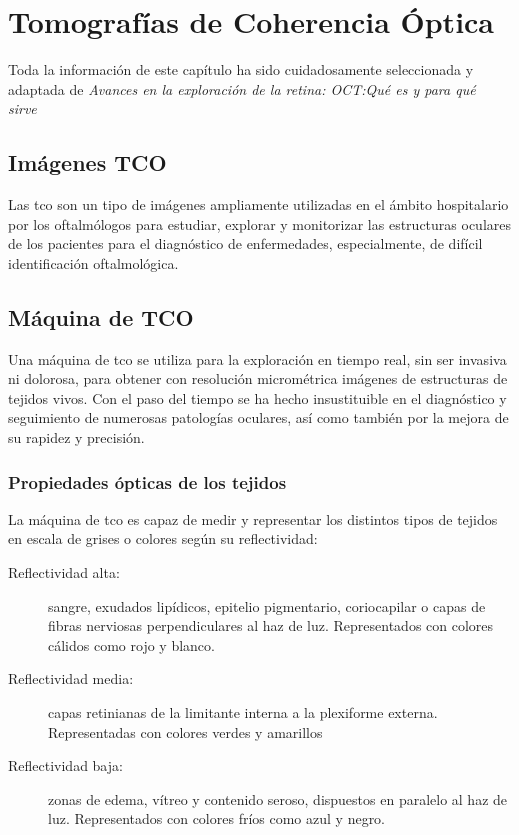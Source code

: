 \chapter{Tomografías de Coherencia Óptica}
Toda la información de este capítulo ha sido cuidadosamente
seleccionada y adaptada de \emph{Avances en la exploración de la
  retina: OCT:\@ Qué es y para qué sirve}~\citep*{oct-bib}

\section{Imágenes TCO}
Las \gls{tco} son un tipo de imágenes ampliamente utilizadas en el
ámbito hospitalario por los oftalmólogos para estudiar, explorar y
monitorizar las estructuras oculares de los pacientes para el
diagnóstico de enfermedades, especialmente, de difícil identificación
oftalmológica.

\section{Máquina de TCO}
Una máquina de \gls{tco} se utiliza para la exploración en tiempo
real, sin ser invasiva ni dolorosa, para obtener con resolución
micrométrica imágenes de estructuras de tejidos vivos. Con el paso del
tiempo se ha hecho insustituible en el diagnóstico y seguimiento de
numerosas patologías oculares, así como también por la mejora de su
rapidez y precisión.

\subsection{Propiedades ópticas de los tejidos}
La máquina de \gls{tco} es capaz de medir y representar los distintos
tipos de tejidos en escala de grises o colores según su reflectividad:
\begin{description}
\item[Reflectividad alta:] sangre, exudados lipídicos, epitelio
  pigmentario, coriocapilar o capas de fibras nerviosas
  perpendiculares al haz de luz. Representados con colores cálidos
  como rojo y blanco.
\item[Reflectividad media:] capas retinianas de la limitante interna a
  la plexiforme externa. Representadas con colores verdes y amarillos
\item[Reflectividad baja:] zonas de edema, vítreo y contenido seroso,
  dispuestos en paralelo al haz de luz. Representados con colores
  fríos como azul y negro.
\end{description}

